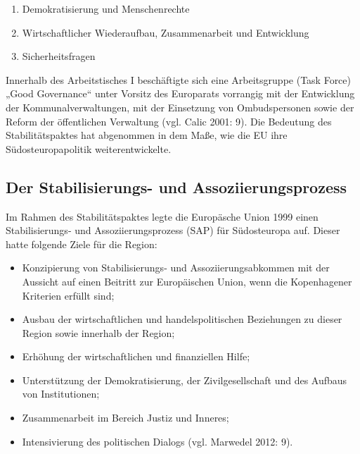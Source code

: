 \begin{enumerate}[label=Tisch {\roman*}:,align=left,  leftmargin=*]
\item Demokratisierung und Menschenrechte
\item Wirtschaftlicher Wiederaufbau, Zusammenarbeit und Entwicklung
\item Sicherheitsfragen
\end{enumerate}
Innerhalb des Arbeitstisches I beschäftigte sich eine Arbeitsgruppe (Task Force) „Good Governance“ unter Vorsitz des Europarats vorrangig mit der Entwicklung der Kommunalverwaltungen, mit der Einsetzung von Ombudspersonen sowie der Reform der öffentlichen Verwaltung (vgl. Calic 2001: 9). Die Bedeutung des Stabilitätspaktes hat abgenommen in dem Maße, wie die EU ihre Südosteuropapolitik weiterentwickelte.

\subsection{Der Stabilisierungs- und Assoziierungsprozess}
Im Rahmen des Stabilitätspaktes legte die Europäsche Union 1999 einen Stabilisierungs- und Assoziierungsprozess (SAP) für Südosteuropa auf. Dieser hatte folgende Ziele für die Region:
\begin{itemize}
\item Konzipierung von Stabilisierungs- und Assoziierungsabkommen mit der Aussicht auf einen
Beitritt zur Europäischen Union, wenn die Kopenhagener Kriterien erfüllt sind;
\item Ausbau der wirtschaftlichen und handelspolitischen Beziehungen zu dieser Region sowie innerhalb der Region;
\item Erhöhung der wirtschaftlichen und finanziellen Hilfe;
\item Unterstützung der Demokratisierung, der Zivilgesellschaft und des Aufbaus von Institutionen;
\item Zusammenarbeit im Bereich Justiz und Inneres;
\item Intensivierung des politischen Dialogs (vgl. Marwedel 2012: 9).
\end{itemize}

